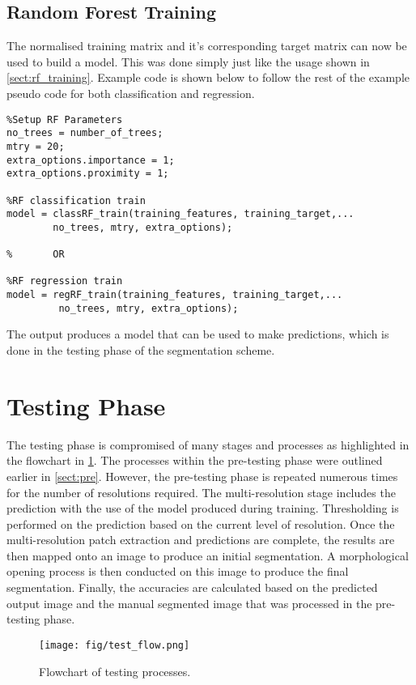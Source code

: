 \subsection{Random Forest Training}
The normalised training matrix and it's corresponding target matrix can now be used to build a model. This was done simply just like the usage shown in \ref{sect:rf_training}. Example code is shown below to follow the rest of the example pseudo code for both classification and regression.

\begin{lstlisting}
%Setup RF Parameters
no_trees = number_of_trees;
mtry = 20;
extra_options.importance = 1;
extra_options.proximity = 1;

%RF classification train
model = classRF_train(training_features, training_target,...
		no_trees, mtry, extra_options);
		
%		OR
		
%RF regression train
model = regRF_train(training_features, training_target,...
		 no_trees, mtry, extra_options);
\end{lstlisting}
\bigskip
The output produces a model that can be used to make predictions, which is done in the testing phase of the segmentation scheme. 
\section{Testing Phase}
\label{sect: teststage}

The testing phase is compromised of many stages and processes as highlighted in the flowchart in \ref{fig:test_flow}. The processes within the pre-testing phase were outlined earlier in \ref{sect:pre}. However, the pre-testing phase is repeated numerous times for the number of resolutions required. The multi-resolution stage includes the prediction with the use of the model produced during training. Thresholding is performed on the prediction based on the current level of resolution. Once the multi-resolution patch extraction and predictions are complete, the results are then mapped onto an image to produce an initial segmentation. A morphological opening process is  then conducted on this image to produce the final segmentation. Finally, the accuracies are calculated based on the predicted output image and the manual segmented image that was processed in the pre-testing phase.

\begin{figure}[H]
\centering
\texttt{[image: fig/test\_flow.png]}
\caption{Flowchart of testing processes.}
\label{fig:test_flow}
\end{figure}

